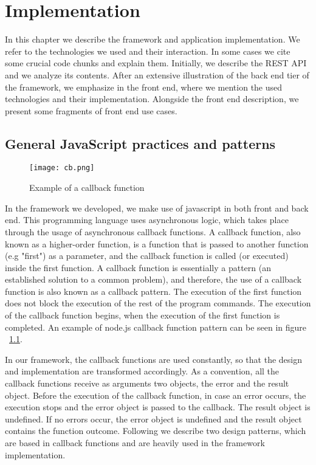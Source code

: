 
\chapter{Implementation}
\label{chapter5_i}
In this chapter we describe the framework and application implementation. We refer to the technologies we used and their interaction. In some cases we cite some crucial code chunks and explain them. Initially, we describe the REST API and we analyze its contents. After an extensive illustration of the back end tier of the framework, we emphasize in the front end, where we mention the used technologies and their implementation. Alongside the front end description, we present some fragments of front end use cases.

\section{General JavaScript practices and patterns}
\begin{figure}
	\centerline{\texttt{[image: cb.png]}}
	\caption{Example of a callback function}
	\label{cb}
\end{figure} 
In the framework we developed, we make use of javascript in both front and back end. This programming language uses asynchronous logic, which takes place through the usage of asynchronous callback functions. A callback function, also known as a higher-order function, is a function that is passed to another function (e.g "first") as a parameter, and the callback function is called (or executed) inside the first function. A callback function is essentially a pattern (an established solution to a common problem), and therefore, the use of a callback function is also known as a callback pattern. The execution of the first function does not block the execution of the rest of the program commands. The execution of the callback function begins, when the execution of the first function is completed. An example of node.js callback function pattern can be seen in figure ~\ref{cb}. \par
	In our framework, the callback functions are used constantly, so that the design and implementation are transformed accordingly. As a convention, all the callback functions receive as arguments two objects, the error and the result object. Before the execution of the callback function, in case an error occurs, the execution stops and the error object is passed to the callback. The result object is undefined. If no errors occur, the error object is undefined and the result object contains the function outcome. Following we describe two design patterns, which are based in callback functions and are heavily used in the framework implementation.

